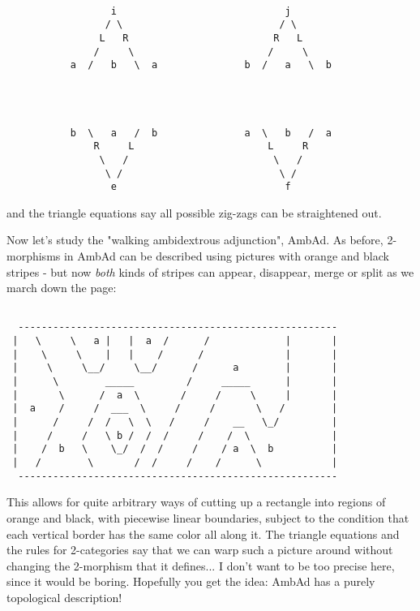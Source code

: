 \begin{verbatim}

                  i                             j
                 / \                           / \
                L   R                         R   L
               /     \                       /     \
           a  /   b   \  a               b  /   a   \  b




           b  \   a   /  b               a  \   b   /  a
               R     L                       L     R
                \   /                         \   /
                 \ /                           \ /
                  e                             f
\end{verbatim}
    
and the triangle equations say all possible zig-zags can be straightened
out.

Now let's study the "walking ambidextrous adjunction",
AmbAd.  As before, 2-morphisms in AmbAd can be described using pictures
with orange and black stripes - but now \emph{both} kinds of stripes
can appear, disappear, merge or split as we march down the page:


\begin{verbatim}

  -------------------------------------------------------
 |   \     \   a |   |  a  /      /             |       |
 |    \     \    |   |    /      /              |       |
 |     \     \__/     \__/      /      a        |       |
 |      \        _____         /     _____      |       |
 |       \      /  a  \       /     /     \     |       |
 |  a    /     /  ___  \     /     /       \   /        |
 |      /     /  /   \  \   /     /    __   \_/         |
 |     /     /   \ b /  /  /     /    /  \              |
 |    /  b   \    \_/  /  /     /    / a  \  b          |
 |   /        \       /  /     /    /      \            |
  -------------------------------------------------------
\end{verbatim}
    
This allows for quite arbitrary ways of cutting up a rectangle into
regions of orange and black, with piecewise linear boundaries, subject
to the condition that each vertical border has the same color all along
it.  The triangle equations and the rules for 2-categories say that we
can warp such a picture around without changing the 2-morphism that it
defines... I don't want to be too precise here, since it would be
boring.  Hopefully you get the idea: AmbAd has a purely topological 
description!  

